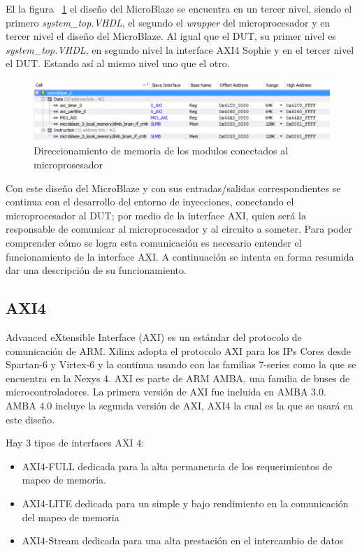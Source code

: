 \documentclass[a4paper,openright,12pt]{report}
\begin{document}
El la figura ~\ref{mmap}  el diseño del MicroBlaze se encuentra en un tercer nivel, siendo el primero \textit{system\_top.VHDL}, el segundo el \textit{wrapper} del microprocesador y en tercer nivel el diseño del MicroBlaze. Al igual que el DUT, su primer nivel es \textit{system\_top.VHDL}, en segundo nivel la interface AXI4 Sophie y en el tercer nivel el DUT. Estando así al mismo nivel uno que el otro.

\begin{figure}[H]
	\centering
	\includegraphics[width=1.1\textwidth]{img/mmap.png}
	\caption{Direccionamiento de memoria de los modulos conectados al microprosesador}
	\label{mmap}
\end{figure}

Con este diseño del MicroBlaze y con sus entradas/salidas correspondientes se continua con el desarrollo del entorno de inyecciones, conectando el microprocesador al DUT; por medio de la interface AXI, quien será la responsable de comunicar al microprocesador y al circuito a someter. Para poder comprender cómo se logra esta comunicación es necesario entender el funcionamiento de la interface AXI.
A continuación se intenta en forma resumida dar una descripción de su funcionamiento.
 


\subsection{ AXI4}


Advanced eXtensible Interface (AXI) es un estándar del protocolo de comunicación de ARM. Xilinx adopta el protocolo AXI para los IPs Cores desde Spartan-6 y Virtex-6 y la continua usando con las familias 7-series como la que se encuentra en la Nexys 4. 
AXI es parte de ARM AMBA, una familia de buses de microcontroladores. La primera versión de AXI fue incluida en AMBA 3.0. AMBA 4.0 incluye la segunda versión de AXI, AXI4 la cual es la que se usará en este diseño.
 

 
Hay 3 tipos de interfaces AXI 4:

\begin{itemize}
\item AXI4-FULL dedicada para la alta permanencia de los requerimientos de mapeo de memoria.
\item AXI4-LITE  dedicada para un simple y bajo rendimiento en la comunicación del mapeo de memoria 
\item AXI4-Stream dedicada para una alta prestación en el intercambio de datos
\end{itemize}
\end{document}
